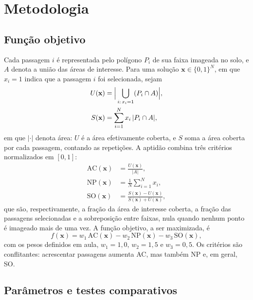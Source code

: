 \section{Metodologia}
\label{sec:metodologia}

\subsection{Função objetivo}

Cada passagem $i$ é representada pelo polígono $P_i$ de sua faixa imageada no solo, e $A$ denota a união das áreas de interesse. Para uma solução $\mathbf{x} \in \{0,1\}^N$, em que $x_i = 1$ indica que a passagem $i$ foi selecionada, sejam
\begin{align}
U(\mathbf{x}) &= \Bigl|\, \bigcup_{i:\,x_i = 1} (P_i \cap A) \Bigr|, \\
S(\mathbf{x}) &= \sum_{i=1}^{N} x_i \, |P_i \cap A|,
\end{align}
em que $|\cdot|$ denota área: $U$ é a área efetivamente coberta, e $S$ soma a área coberta por cada passagem, contando as repetições. A aptidão combina três critérios normalizados em $[0,1]$:
\begin{align}
\mathrm{AC}(\mathbf{x}) &= \frac{U(\mathbf{x})}{|A|}, \label{eq:ac} \\
\mathrm{NP}(\mathbf{x}) &= \frac{1}{N} \sum_{i=1}^{N} x_i, \label{eq:np} \\
\mathrm{SO}(\mathbf{x}) &= \frac{S(\mathbf{x}) - U(\mathbf{x})}{S(\mathbf{x}) + U(\mathbf{x})}, \label{eq:so}
\end{align}
que são, respectivamente, a fração da área de interesse coberta, a fração das passagens selecionadas e a sobreposição entre faixas, nula quando nenhum ponto é imageado mais de uma vez. A função objetivo, a ser maximizada, é
\begin{equation}
f(\mathbf{x}) = w_1\,\mathrm{AC}(\mathbf{x}) - w_2\,\mathrm{NP}(\mathbf{x}) - w_3\,\mathrm{SO}(\mathbf{x}),
\label{eq:objetivo}
\end{equation}
com os pesos definidos em aula, $w_1 = 1,0$, $w_2 = 1,5$ e $w_3 = 0,5$. Os critérios são conflitantes: acrescentar passagens aumenta AC, mas também NP e, em geral, SO.

\subsection{Parâmetros e testes comparativos}

